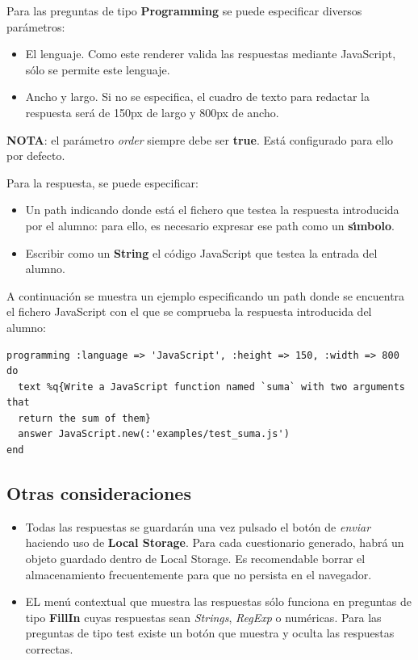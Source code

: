 Para las preguntas de tipo {\bfseries Programming} se puede especificar diversos par\'ametros:
\begin{itemize}
  \item El lenguaje. Como este renderer valida las respuestas mediante JavaScript, s\'olo se permite este lenguaje.
  \item Ancho y largo. Si no se especifica, el cuadro de texto para redactar la respuesta ser\'a de 150px de largo y 800px de ancho.
\end{itemize}

{\bfseries NOTA}: el par\'ametro \textit{order} siempre debe ser {\bfseries true}. Est\'a configurado para ello por defecto.
\bigskip
\bigskip

Para la respuesta, se puede especificar: 
\begin{itemize}
  \item Un path indicando donde est\'a el fichero que testea la respuesta introducida por el alumno: para ello, es necesario expresar ese path como un {\bfseries s\'{\i}mbolo}.
  \item Escribir como un {\bfseries String} el c\'odigo JavaScript que testea la entrada del alumno.
\end{itemize}
\bigskip

A continuaci\'on se muestra un ejemplo especificando un path donde se encuentra el fichero JavaScript con el que se comprueba la respuesta introducida del alumno:
\begin{verbatim}
programming :language => 'JavaScript', :height => 150, :width => 800  do
  text %q{Write a JavaScript function named `suma` with two arguments that
  return the sum of them}
  answer JavaScript.new(:'examples/test_suma.js')
end
\end{verbatim}

\subsection{Otras consideraciones}
\label{subsec:Apendice2.9}

\begin{itemize}
  \item Todas las respuestas se guardar\'an una vez pulsado el bot\'on de \textit{enviar} haciendo uso de {\bfseries Local Storage}. Para cada cuestionario generado, habr\'a 
  un objeto guardado dentro de Local Storage. Es recomendable borrar el almacenamiento frecuentemente para que no persista en el navegador.
  \item EL men\'u contextual que muestra las respuestas s\'olo funciona en preguntas de tipo {\bfseries FillIn} cuyas respuestas sean \textit{Strings}, \textit{RegExp} o num\'ericas.
  Para las preguntas de tipo test existe un bot\'on que muestra y oculta las respuestas correctas.
\end{itemize}

